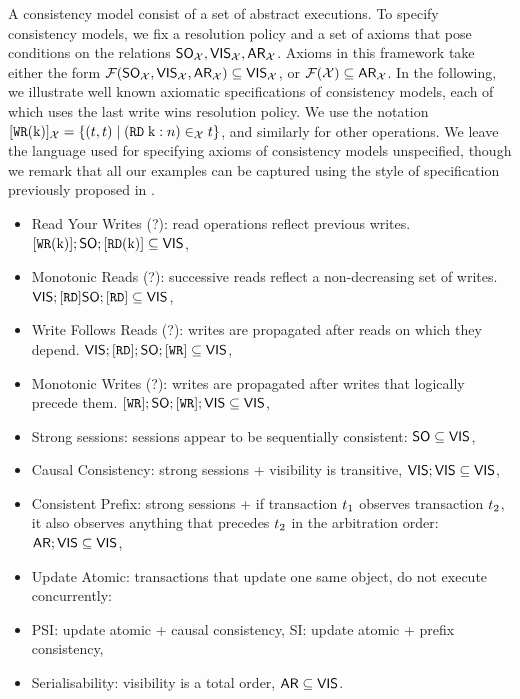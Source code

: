 A consistency model consist of a set of abstract executions. 
To specify consistency models, we fix a resolution policy and 
a set of axioms that pose conditions on the relations ${\sf{SO}}_{\mathcal{X}}, {\mathsf{VIS}}_{\mathcal{X}}, {\sf{AR}}_{\mathcal{X}}$. 
Axioms in this framework take either the form $\mathcal{F}({\sf{SO}}_{\mathcal{X}}, {\mathsf{VIS}}_{\mathcal{X}}, {\sf{AR}}_{\mathcal{X}}) \subseteq {\mathsf{VIS}}_{\mathcal{X}}$, 
or $\mathcal{F}(\mathcal{X}) \subseteq {\sf{AR}}_{\mathcal{X}}$. In the following, we illustrate well 
known axiomatic specifications of consistency models, each of which uses the 
last write wins resolution policy. We use the notation 
$[{{\tt WR}}(\mathrm{k})]_{\mathcal{X}} = \{ (t, t) \mid ({{\tt RD}}\; \mathrm{k}: n) \in_{\mathcal{X}} t \}$, and 
similarly for other operations. 
We leave the language used for specifying axioms of consistency models unspecified, though 
we remark that all our examples can be captured using the style of specification previously 
proposed in \cite{laws}.

\begin{itemize}
\item Read Your Writes (?): read operations reflect previous writes. $[{{\tt WR}}(\mathrm{k})] ; {\sf{SO}} ; [{{\tt RD}}(\mathrm{k})] \subseteq {\mathsf{VIS}}$, 
\item Monotonic Reads (?): successive reads reflect a non-decreasing set of writes. ${\mathsf{VIS}}; [{{\tt RD}}] {\sf{SO}} ; [{{\tt RD}}] \subseteq {\mathsf{VIS}}$, 
\item Write Follows Reads (?): writes are propagated after reads on which they depend. ${\mathsf{VIS}}; [{{\tt RD}}]; {\sf{SO}}; [{{\tt WR}}] \subseteq {\mathsf{VIS}}$, 
\item Monotonic Writes (?): writes are propagated after writes that logically precede them. $[{{\tt WR}}]; {\sf{SO}}; [{{\tt WR}}]; {\mathsf{VIS}} \subseteq {\mathsf{VIS}}$, 
\item Strong sessions: sessions appear to be sequentially consistent: ${\sf{SO}} \subseteq {\mathsf{VIS}}$, 
\item Causal Consistency: strong sessions + visibility is transitive, ${\mathsf{VIS}} ; {\mathsf{VIS}} \subseteq {\mathsf{VIS}}$, 
\item Consistent Prefix: strong sessions + if transaction $t_1$ observes transaction $t_2$, it also observes 
anything that precedes $t_2$ in the arbitration order: ${\sf{AR}} ; {\mathsf{VIS}} \subseteq {\mathsf{VIS}}$, 
\item Update Atomic: transactions that update one same object, do not execute concurrently: 
\item PSI: update atomic + causal consistency, SI: update atomic + prefix consistency, 
\item Serialisability: visibility is a total order, ${\sf{AR}} \subseteq {\mathsf{VIS}}$.
\end{itemize}



